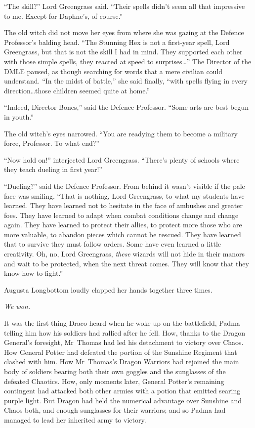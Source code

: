 “The skill?” Lord Greengrass said. “Their spells didn’t seem all that impressive to me. Except for Daphne’s, of course.”

The old witch did not move her eyes from where she was gazing at the Defence Professor’s balding head. “The Stunning Hex is not a first-year spell, Lord Greengrass, but that is not the skill I had in mind. They supported each other with those simple spells, they reacted at speed to surprises…” The Director of the DMLE paused, as though searching for words that a mere civilian could understand. “In the midst of battle,” she said finally, “with spells flying in every direction…those children seemed quite at home.”

“Indeed, Director Bones,” said the Defence Professor. “Some arts are best begun in youth.”

The old witch’s eyes narrowed. “You are readying them to become a military force, Professor. To what end?”

“Now hold on!” interjected Lord Greengrass. “There’s plenty of schools where they teach dueling in first year!”

“Dueling?” said the Defence Professor. From behind it wasn’t visible if the pale face was smiling. “That is nothing, Lord Greengrass, to what my students have learned. They have learned not to hesitate in the face of ambushes and greater foes. They have learned to adapt when combat conditions change and change again. They have learned to protect their allies, to protect more those who are more valuable, to abandon pieces which cannot be rescued. They have learned that to survive they must follow orders. Some have even learned a little creativity. Oh, no, Lord Greengrass, \emph{these} wizards will not hide in their manors and wait to be protected, when the next threat comes. They will know that they know how to fight.”

Augusta Longbottom loudly clapped her hands together three times.

\later

\emph{We won.}

It was the first thing Draco heard when he woke up on the battlefield, Padma telling him how his soldiers had rallied after he fell. How, thanks to the Dragon General’s foresight, Mr~Thomas had led his detachment to victory over Chaos. How General Potter had defeated the portion of the Sunshine Regiment that clashed with him. How Mr~Thomas’s Dragon Warriors had rejoined the main body of soldiers bearing both their own goggles and the sunglasses of the defeated Chaotics. How, only moments later, General Potter’s remaining contingent had attacked both other armies with a potion that emitted searing purple light. But Dragon had held the numerical advantage over Sunshine and Chaos both, and enough sunglasses for their warriors; and so Padma had managed to lead her inherited army to victory.

